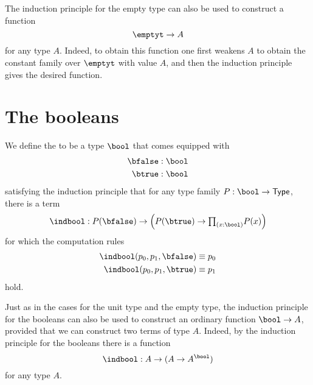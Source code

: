 The induction principle for the empty type can also be used to construct a function
\begin{equation*}
  \emptyt\to A
\end{equation*}
for any type $A$. Indeed, to obtain this function one first weakens $A$ to obtain the constant family over $\emptyt$ with value $A$, and then the induction principle gives the desired function.

\section{The booleans}
\begin{defn}
We define the  to be a type $\bool$ that comes equipped with
\begin{align*}
\bfalse & : \bool \\
\btrue & : \bool
\end{align*}
satisfying the induction principle that for any type family $P:\bool\to\type$, there is a term
\begin{equation*}
\indbool : P(\bfalse)\to \Big(P(\btrue)\to \prd{x:\bool}P(x)\Big)
\end{equation*}
for which the computation rules
\begin{align*}
\indbool(p_0,p_1,\bfalse) & \jdeq p_0 \\
\indbool(p_0,p_1,\btrue) & \jdeq p_1
\end{align*}
hold.
\end{defn}

Just as in the cases for the unit type and the empty type, the induction principle for the booleans can also be used to construct an ordinary function $\bool\to A$, provided that we can construct two terms of type $A$. Indeed, by the induction principle for the booleans there is a function
\begin{equation*}
  \indbool : A \to (A\to A^\bool)
\end{equation*}
for any type $A$.

